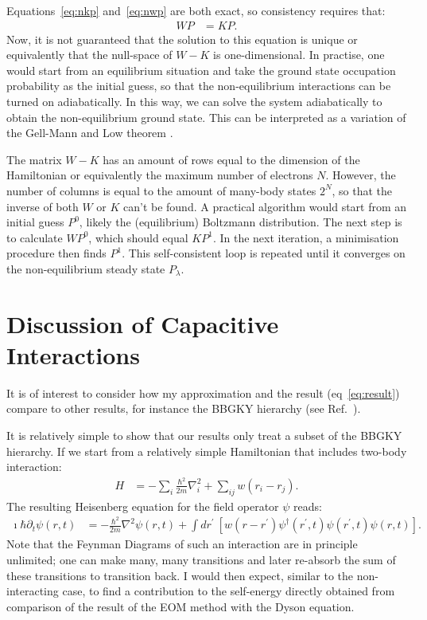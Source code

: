Equations~\ref{eq:nkp} and~\ref{eq:nwp} are both exact, so consistency requires that:
\begin{align}
WP &= KP. \label{eq:selfconsistency}
\end{align}
Now, it is not guaranteed that the solution to this equation is unique or equivalently that the null-space of $W-K$ is one-dimensional. In practise, one would start from an equilibrium situation and take the ground state occupation probability as the initial guess, so that the non-equilibrium interactions can be turned on adiabatically. In this way, we can solve the system adiabatically to obtain the non-equilibrium ground state. This can be interpreted as a variation of the Gell-Mann and Low theorem \cite{gellmannlow, molinari}.

The matrix $W-K$ has an amount of rows equal to the dimension of the Hamiltonian or equivalently the maximum number of electrons $N$. However, the number of columns is equal to the amount of many-body states $2^N$, so that the inverse of both $W$ or $K$ can't be found. A practical algorithm would start from an initial guess $P^0$, likely the (equilibrium) Boltzmann distribution. The next step is to calculate $WP^0$, which should equal $KP^1$. In the next iteration, a minimisation procedure then finds $P^1$. This self-consistent loop is repeated until it converges on the non-equilibrium steady state $P_\lambda$.



\section{Discussion of Capacitive Interactions}
\label{sec:discussioncapacitive}
It is of interest to consider how my approximation and the result (eq~\ref{eq:result}) compare to other results, for instance the BBGKY hierarchy (see Ref.~\cite{diventra}).

It is relatively simple to show that our results only treat a subset of the BBGKY hierarchy. If we start from a relatively simple Hamiltonian that includes two-body interaction:
\begin{align*}
H &= -\sum_i \frac{\hbar^2}{2m} \nabla_i^2 + \sum_{ij} w(r_i - r_j).
\end{align*}
The resulting Heisenberg equation for the field operator $\psi$ reads:
\begin{align*}
\imath\hbar\partial_t \psi(r, t) &= -\frac{\hbar^2}{2m} \nabla^2 \psi(r,t) + \int dr^\prime \: \left[ w(r-r^\prime) \psi^\dagger (r^\prime, t) \psi(r^\prime,t) \psi(r,t)\right].
\end{align*} 
Note that the Feynman Diagrams of such an interaction are in principle unlimited; one can make many, many transitions and later re-absorb the sum of these transitions to transition back. I would then expect, similar to the non\hyp{}interacting case, to find a contribution to the self-energy directly obtained from comparison of the result of the EOM method with the Dyson equation.

